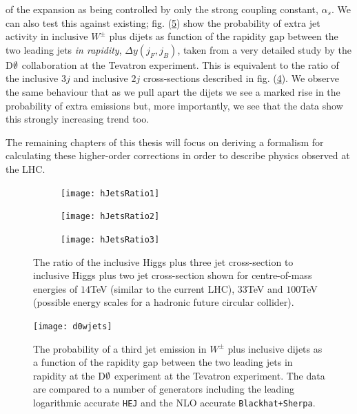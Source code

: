 		of the expansion as being controlled by only the strong coupling constant, $\alpha_s$.  We can also test this against existing; fig.
		(\ref{fig:d0wjets}) show the probability of extra jet activity in inclusive $W^\pm$ plus dijets as function of the rapidity gap
		between the two leading jets \emph{in rapidity}, $\Delta y(j_F, j_B)$, taken from a very detailed study by the D$\emptyset$
		collaboration \cite{Abazov:2013gpa} at the Tevatron experiment.  This is equivalent to the ratio of the inclusive $3j$ and
		inclusive $2j$ cross-sections described in fig. (\ref{fig:higgsratios}).  We observe the same behaviour that as we pull apart
		the dijets we see a marked rise in the probability of extra emissions but, more importantly, we see that the data show this
		strongly increasing trend too.

		The remaining chapters of this thesis will focus on deriving a formalism for calculating these higher-order corrections in order
		to describe physics observed at the LHC.

		\begin{figure}[tpb]
			\centering
			\hspace{-0.8cm}
			\begin{subfigure}[b]{0.7\textwidth}
				\texttt{[image: hJetsRatio1]}
				\caption{}
				\label{fig:hJetsRatio1}
			\end{subfigure}
			\begin{subfigure}[b]{0.48\textwidth}
				\texttt{[image: hJetsRatio2]}
				\caption{}
				\label{fig:hJetsRatio2}
			\end{subfigure}
			\begin{subfigure}[b]{0.48\textwidth}
				\texttt{[image: hJetsRatio3]}
				\caption{}
				\label{fig:hJetsRatio3}
			\end{subfigure}

			\caption{The ratio of the inclusive Higgs plus three jet cross-section to inclusive Higgs plus two jet cross-section
			         shown for centre-of-mass energies of $14$TeV (similar to the current LHC), $33$TeV and $100$TeV (possible
			         energy scales for a hadronic future circular collider).}

			\label{fig:higgsratios}
		\end{figure}

		\begin{figure}[hbtp]
			\centering
			\texttt{[image: d0wjets]}
			\caption{The probability of a third jet emission in $W^\pm$ plus inclusive dijets as a function of the rapidity gap
			         between the two leading jets in rapidity at the D$\emptyset$ experiment at the Tevatron experiment.
			         The data are compared to a number of generators including the leading logarithmic accurate \texttt{HEJ}
			         and the NLO accurate \texttt{Blackhat+Sherpa}.}
			\label{fig:d0wjets}
  		\end{figure}

